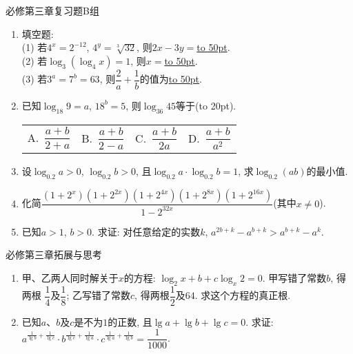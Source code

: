 \documentclass[10pt,a4paper]{article}
\newcommand{\blank}[1]{\underline{\hbox to #1pt{}}}
\newcommand{\bracket}[1]{(\hbox to #1pt{})}
\newcommand{\fourch}[4]{\par\begin{tabular}{p{.23\textwidth}p{.23\textwidth}p{.23\textwidth}p{.23\textwidth}}
A.~#1 &B.~#2& C.~#3& D.~#4
\end{tabular}}
\begin{document}
必修第三章复习题B组
\begin{enumerate}[1.]

\item 填空题:\\
(1) 若$4^x=2^{-12}$, $4^y=\sqrt[3]{32}$, 则$2x-3y=$\blank{50}.\\
(2) 若$\log_3(\log_4 x)=1$, 则$x=$\blank{50}.\\
(3) 若$3^a=7^b=63$, 则$\dfrac 2a+\dfrac 1b$的值为\blank{50}.\\
\vspace*{3cm}
\item 已知$\log_{18}9=a$, $18^b=5$, 则$\log_{36}45$等于\bracket{20}.
\fourch{$\dfrac{a+b}{2+a}$}{$\dfrac{a+b}{2-a}$}{$\dfrac{a+b}{2a}$}{$\dfrac{a+b}{a^2}$}
\vspace*{3cm}
\item 设$\log_{0.2}a>0$, $\log_{0.2}b>0$, 且$\log_{0.2}a\cdot \log_{0.2}b=1$, 求$\log_{0.2}(ab)$的最小值.
\vspace*{3cm}
\item 化简$\dfrac{(1+2^x)(1+2^{2x})(1+2^{4x})(1+2^{8x})(1+2^{16x})}{1-2^{32x}}$(其中$x\ne 0$).
\vspace*{3cm}
\item 已知$a>1$, $b>0$. 求证: 对任意给定的实数$k$, $a^{2b+k}-a^{b+k}>a^{b+k}-a^k$.
\vspace*{3cm}
\end{enumerate}

必修第三章拓展与思考
\begin{enumerate}[1.]

\item 甲、乙两人同时解关于$x$的方程: $\log_2x+b+c\log_x2=0$. 甲写错了常数$b$, 得两根
$\dfrac 14$及$\dfrac 18$; 乙写错了常数$c$, 得两根$\dfrac 12$及$64$. 求这个方程的真正根.
\vspace*{3cm}
\item 已知$a$、$b$及$c$是不为$1$的正数, 且$\lg a+\lg b+\lg c=0$. 求证: $a^{\frac{1}{\lg b}+\frac{1}{\lg c}}\cdot b^{\frac{1}{\lg c}+\frac{1}{\lg a}}\cdot c^{\frac{1}{\lg a}+\frac{1}{\lg b}}=\dfrac{1}{1000}$.
\vspace*{3cm}
\end{enumerate}
\end{document}
